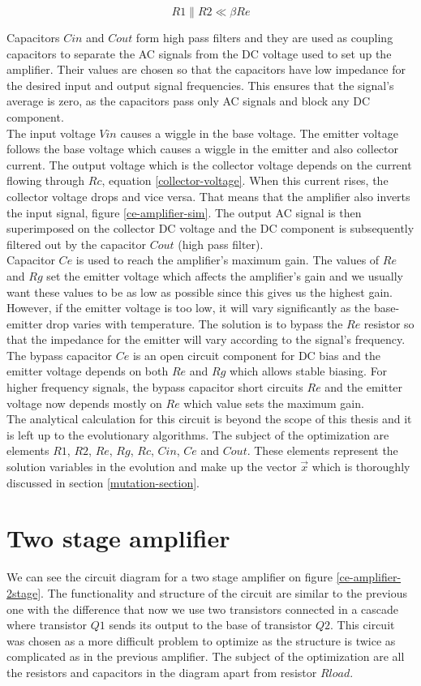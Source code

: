 \begin{equation} \label{divider-impedance}
    R1 \| R2 \ll \beta Re
\end{equation}

Capacitors $Cin$ and $Cout$ form high pass filters and they are used as coupling capacitors to separate the AC signals from the DC voltage used to set up the amplifier. Their values are chosen so that the capacitors have low impedance for the desired input and output signal frequencies. This ensures that the signal's average is zero, as the capacitors pass only AC signals and block any DC component.\\
The input voltage $Vin$ causes a wiggle in the base voltage. The emitter voltage follows the base voltage which causes a wiggle in the emitter and also collector current. The output voltage which is the collector voltage depends on the current flowing through $Rc$, equation \ref{collector-voltage}. When this current rises, the collector voltage drops and vice versa. That means that the amplifier also inverts the input signal, figure \ref{ce-amplifier-sim}. The output AC signal is then superimposed on the collector DC voltage and the DC component is subsequently filtered out by the capacitor $Cout$ (high pass filter).\\
Capacitor $Ce$ is used to reach the amplifier's maximum gain. The values of $Re$ and $Rg$ set the emitter voltage which affects the amplifier's gain and we usually want these values to be as low as possible since this gives us the highest gain. However, if the emitter voltage is too low, it will vary significantly as the base-emitter drop varies with temperature. The solution is to bypass the $Re$ resistor so that the impedance for the emitter will vary according to the signal's frequency. The bypass capacitor $Ce$ is an open circuit component for DC bias and the emitter voltage depends on both $Re$ and $Rg$ which allows stable biasing. For higher frequency signals, the bypass capacitor short circuits $Re$ and the emitter voltage now depends mostly on $Re$ which value sets the maximum gain.\\
The analytical calculation for this circuit is beyond the scope of this thesis and it is left up to the evolutionary algorithms. The subject of the optimization are elements $R1$, $R2$, $Re$, $Rg$, $Rc$, $Cin$, $Ce$ and $Cout$. These elements represent the solution variables in the evolution and make up the vector $\vec{x}$ which is thoroughly discussed in section \ref{mutation-section}.

\section{Two stage amplifier}
We can see the circuit diagram for a two stage amplifier on figure \ref{ce-amplifier-2stage}. The functionality and structure of the circuit are similar to the previous one with the difference that now we use two transistors connected in a cascade where transistor $Q1$ sends its output to the base of transistor $Q2$. This circuit was chosen as a more difficult problem to optimize as the structure is twice as complicated as in the previous amplifier. The subject of the optimization are all the resistors and capacitors in the diagram apart from resistor $Rload$.

